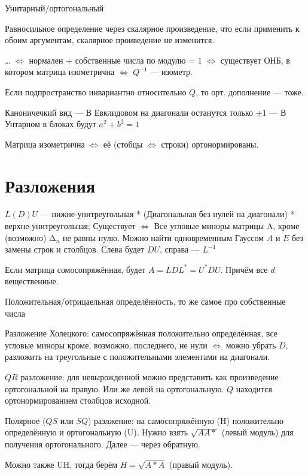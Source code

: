 \documentclass[12pt, a4paper]{article}
\begin{document}
Унитарный/ортогональный

Равносильное определение через скалярное произведение, что если применить к обоим аргументам, скалярное проиведение не изменится.



…
$\Longleftrightarrow$ нормален + собственные числа по модулю = 1
$\Longleftrightarrow$ существует ОНБ, в котором матрица изометрична
$\Longleftrightarrow$ $Q^{-1}$ — изометр.

Если подпространство инвариантно относительно $Q$, то орт. дополнение — тоже.

Каноничечкий вид
— В Евклидовом на диагонали останутся только $± 1$
— В Унтарном в блоках будут $a^2 + b^2 = 1$

Матрица изометрична $\Longleftrightarrow$ её (стобцы $\Longleftrightarrow$ строки) ортонормированы.


\section{Разложения}

$L(D)U$ — нижне-унитреугольная * (Диагональная без нулей на диагонали) * верхне-унитреугольная; 
Существует $\Longleftrightarrow$ Все угловые миноры матрицы A, кроме (возможно) $∆_n$ не равны нулю. 
Можно найти одновременным Гауссом $A$ и $E$ без замены строк и столбцов. Слева будет $DU$, справа — $L^{-1}$

Если матрица сомосопряжённая, будет $A = LDL^* = U^*DU$. Причём все $d$ вещественные.

Положительная/отрицаельная определённость, то же самое про собственные числа

Разложение Холецкого: самосопряжённая положительно определённая, все угловые миноры кроме, возможно, последнего, не нули $\Longleftrightarrow$ можно убрать $D$, 
разложить на треугольные с положительными элементами на диагонали.

$QR$ разложение: для невырожденной можно представить как произведение ортогональной на правую. Или же левой на ортогональную.
$Q$ находится ортонормированием столбцов исходной.

Полярное ($QS$ или $SQ$) разлжение: на самосопряжённую (H) положительно определённую и ортогональную (U). 
Нужно взять $\sqrt{AA*}$ (левый модуль) для получения ортогонального. Далее — через обратную.

Можно также UH, тогда берём $H = \sqrt{A*A}$ (правый модуль).
\end{document}
